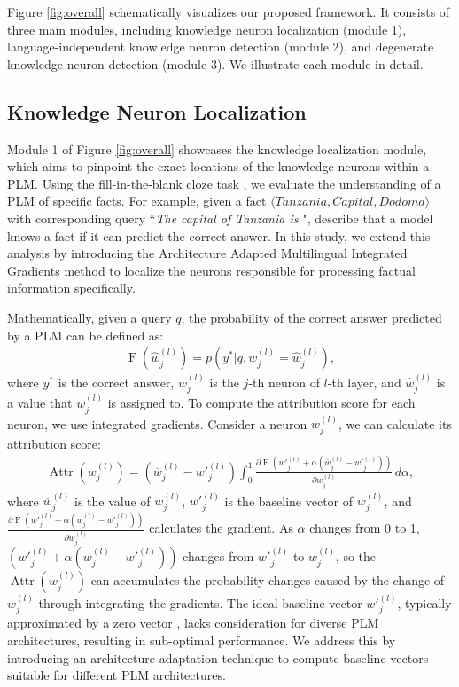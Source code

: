 \documentclass[]{article}
\begin{document}
Figure \ref{fig:overall} schematically visualizes our proposed framework. It consists of three main modules, including knowledge neuron localization (module 1), language-independent knowledge neuron detection (module 2), and degenerate knowledge neuron detection (module 3). We illustrate each module in detail.
\subsection{Knowledge Neuron Localization}
Module 1 of Figure \ref{fig:overall} showcases the knowledge localization module, which aims to pinpoint the exact locations of the knowledge neurons within a PLM. Using the fill-in-the-blank cloze task \cite{fill-in-the-blank}, we evaluate the understanding of a PLM of specific facts. For example, given a fact $\langle \textit{Tanzania}, \textit{Capital}, \textit{Dodoma} \rangle$ with corresponding query ``\textit{The capital of Tanzania is \underline{\hspace{0.4cm}}}", \citeauthor{fill-in-the-blank} describe that a model knows a fact if it can predict the correct answer. In this study, we extend this analysis by introducing the Architecture Adapted Multilingual Integrated Gradients method to localize the neurons responsible for processing factual information specifically.

Mathematically, given a query $q$, the probability of the correct answer predicted by a PLM can be defined as:
{\small \begin{align}
\label{eq:1}
      \operatorname{F}(\hat{w}^{(l)}_{j}) = p(y^* | q, w^{(l)}_{j}=\hat{w}^ {(l)}_{j}),
\end{align}}where $y^*$ is the correct answer, ${w}^{(l)}_{j}$ is the $j$-th neuron of $l$-th layer, and $\hat{w}^ {(l)}_{j}$ is a value that ${w}^ {(l)}_{j}$ is assigned to. To compute the attribution score for each neuron, we use integrated gradients\cite{ig}. Consider a neuron ${w}^ {(l)}_{j}$, we can calculate its attribution score:
{\small
\begin{align}
    \label{eqution:attribute}
     \operatorname{Attr}({w}^{(l)}_{j}) = (\overline{w}^{(l)}_{j} - {w'}^{(l)}_{j}) \int_{0}^{1} \frac{\partial \operatorname{F}({w'}^{(l)}_{j} + \alpha(\overline{w}^{(l)}_{j} - {w'}^{(l)}_{j}))}{\partial {w}^{(l)}_{j}}  \, d\alpha,
\end{align}}where $\overline{w}^{(l)}_{j}$ is the value of ${w}^{(l)}_{j}$, ${w'}^{(l)}_{j}$ is the baseline vector of ${w}^{(l)}_{j}$, and $\frac{\partial \operatorname{F}({w'}^{(l)}_{j} + \alpha({w}^{(l)}_{j} - {w'}^{(l)}_{j}))}{\partial {w}^{(l)}_{j}}$ calculates the gradient. As $\alpha$ changes from 0 to 1, $({w'}^{(l)}_{j} + \alpha({w}^{(l)}_{j} - {w'}^{(l)}_{j}))$ changes from ${w'}^{(l)}_{j}$ to ${w}^{(l)}_{j}$, so the $\operatorname{Attr}({w}^{(l)}_{j})$ can accumulates the probability changes caused by the change of ${w}^{(l)}_{j}$ through integrating the gradients.
The ideal baseline vector ${w'}^{(l)}_{j}$, typically approximated by a zero vector \cite{transparent}, lacks consideration for diverse PLM architectures, resulting in sub-optimal performance. We address this by introducing an architecture adaptation technique to compute baseline vectors suitable for different PLM architectures.
\end{document}
